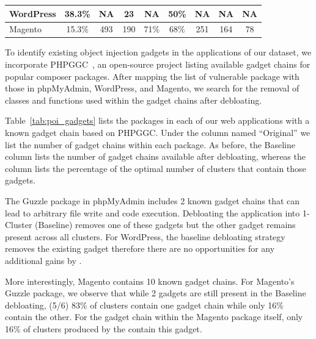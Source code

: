 \begin{table}[]
\begin{tabular}{|l|c|c|c|c|c|ccc|}
    WordPress                                   & 38.3\%                                                                                          & NA                                    & 23                                   & NA                                                             & 50\%                                    & \multicolumn{1}{c|}{NA}                         & \multicolumn{1}{c|}{NA}                 & \multicolumn{1}{c|}{NA}  \\ \hline
    Magento                                     & 15.3\%                                                                                          & 493                                   & 190                                  & 71\%                                                           & 68\%                                    & \multicolumn{1}{c|}{251}                        & \multicolumn{1}{c|}{164}                & \multicolumn{1}{c|}{78}  \\ \hline
    \end{tabular}
\end{table}

To identify existing object injection gadgets in the applications of our dataset, we incorporate PHPGGC~\cite{PHPGGC}, an open-source project listing available gadget chains for popular composer packages. 
After mapping the list of vulnerable package with those in phpMyAdmin, WordPress, and Magento, we search for the removal of classes and functions used within the gadget chains after debloating. 

Table~\ref{tab:poi_gadgets} lists the packages in each of our web applications with a known gadget chain based on PHPGGC. 
Under the column named ``Original'' we list the number of gadget chains within each package. 
As before, the Baseline column lists the number of gadget chains available after debloating, whereas the \sys{} column lists the percentage of the optimal number of clusters that contain those gadgets. 

The Guzzle package in phpMyAdmin includes 2 known gadget chains that can lead to arbitrary file write and code execution. 
Debloating the application into 1-Cluster (Baseline) removes one of these gadgets but the other gadget remains present across all clusters. 
For WordPress, the baseline debloating strategy removes the existing gadget therefore there are no opportunities for any additional gains by \sys{}.

More interestingly, Magento contains 10 known gadget chains. 
For Magento's Guzzle package, we observe that while 2 gadgets are still present in the Baseline debloating, (5/6) 83\% of clusters contain one gadget chain while only 16\% contain the other. 
For the gadget chain within the Magento package itself, only 16\% of clusters produced by the \sys{} contain this gadget. 

